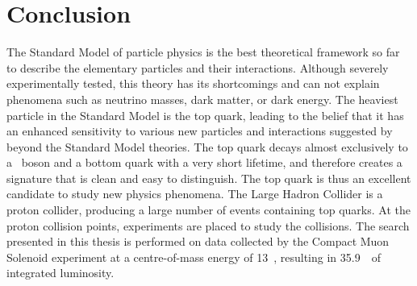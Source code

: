 \section{Conclusion}
The Standard Model of particle physics is the best theoretical framework so far to describe the elementary particles and their interactions. Although severely experimentally tested, this theory has its shortcomings and can not explain phenomena such as neutrino masses, dark matter, or dark energy. The heaviest particle in the Standard Model is the top quark, leading to the belief that it has an enhanced sensitivity to various new particles and interactions suggested by beyond the Standard Model theories. The top quark decays almost exclusively to a \PW\ boson and a bottom quark with a very short lifetime, and therefore creates a signature that is clean and easy to distinguish. The top quark is thus an excellent candidate to study new physics phenomena. The Large Hadron Collider is a proton collider, producing a large number of events containing top quarks. At the proton collision points, experiments are placed to study the collisions. The search presented in this thesis is performed on data collected by the Compact Muon Solenoid experiment at a centre-of-mass energy of 13~\TeV, resulting in 35.9~\fbinv\ of integrated luminosity. 


